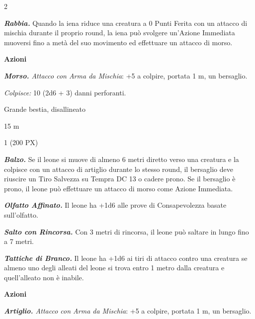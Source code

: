 \begin{multicols}{2}
{\emph{\textbf{Rabbia.}} Quando la iena riduce una creatura a 0 Punti Ferita con un attacco di mischia durante il proprio round, la iena può svolgere un'Azione Immediata muoversi fino a metà del suo movimento ed effettuare un attacco di morso.

\textbf{Azioni}

\emph{\textbf{Morso.} Attacco con Arma da Mischia}: +5 a colpire, portata 1 m, un bersaglio.

\emph{Colpisce:} 10 (2d6 + 3) danni perforanti.

\begin{description}[noitemsep, topsep=0pt, parsep=0pt, partopsep=0pt, itemsep=1pt, leftmargin=2.35cm,  labelwidth=2.2cm, itemindent=0cm, listparindent=0pt] %
\setlength{\baselineskip}{10pt}
\item[\textbf{Taglia/Tipo}] Grande bestia, disallineato
\item[\textbf{Caratt.}] 
\item[\textbf{Punti Ferita}] 
\item[\textbf{Tiri Salvez.}] 
\item[\textbf{Movimento}] 15 m
\item[\textbf{Sfida}] 1 (200 PX)
\end{description}
\smallskip

\emph{\textbf{Balzo.}} Se il leone si muove di almeno 6 metri diretto verso una creatura e la colpisce con un attacco di artiglio durante lo stesso round, il bersaglio deve riuscire un Tiro Salvezza su Tempra DC 13 o cadere prono. Se il bersaglio è prono, il leone può effettuare un attacco di morso come Azione Immediata.

\emph{\textbf{Olfatto Affinato.}} Il leone ha +1d6 alle prove di Consapevolezza basate sull'olfatto.

\emph{\textbf{Salto con Rincorsa.}} Con 3 metri di rincorsa, il leone può saltare in lungo fino a 7 metri.

\emph{\textbf{Tattiche di Branco.}} Il leone ha +1d6 ai tiri di attacco contro una creatura se almeno uno degli alleati del leone si trova entro 1 metro dalla creatura e quell'alleato non è inabile.

\textbf{Azioni}

\emph{\textbf{Artiglio.} Attacco con Arma da Mischia}: +5 a colpire, portata 1 m, un bersaglio.

}
\end{multicols}
